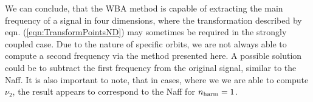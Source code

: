 We can conclude, that the WBA method is capable of extracting the main frequency of a signal in four dimensions, where the transformation described by eqn. (\ref{eqn:TransformPointsND}) may sometimes be required in the strongly coupled case.
Due to the nature of specific orbits, we are not always able to compute a second frequency via the method presented here.
A possible solution could be to subtract the first frequency from the original signal, similar to the Naff.
It is also important to note, that in cases, where we we are able to compute $\nu_2$, the result appears to correspond to the Naff for $n_\text{harm}=1$.
